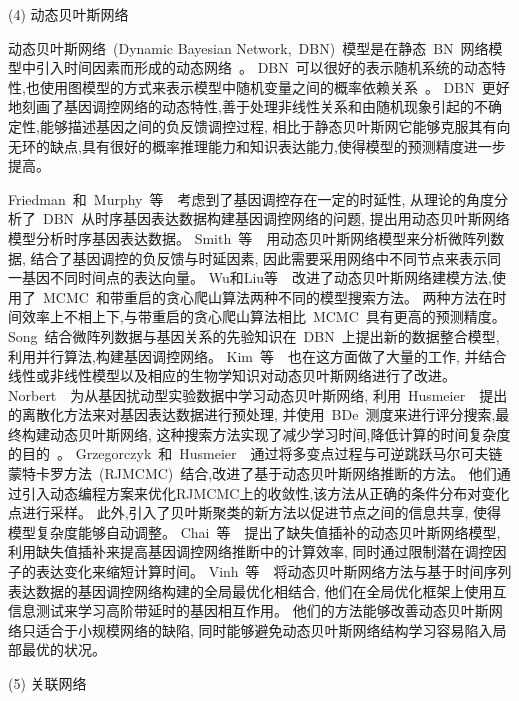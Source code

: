 (4) 动态贝叶斯网络

动态贝叶斯网络~(Dynamic Bayesian Network,~DBN)~模型是在静态~BN~网络模型中引入时间因素而形成的动态网络~\cite{dondelinger2010heterogeneous,grzegorczyk2010improvements}。
DBN~可以很好的表示随机系统的动态特性,也使用图模型的方式来表示模型中随机变量之间的概率依赖关系~\cite{hecker2009gene}。
DBN~更好地刻画了基因调控网络的动态特性,善于处理非线性关系和由随机现象引起的不确定性,能够描述基因之间的负反馈调控过程,
相比于静态贝叶斯网它能够克服其有向无环的缺点,具有很好的概率推理能力和知识表达能力,使得模型的预测精度进一步提高。

Friedman~和~Murphy~等~\cite{friedman2004inferring}~考虑到了基因调控存在一定的时延性,
从理论的角度分析了~DBN~从时序基因表达数据构建基因调控网络的问题, 提出用动态贝叶斯网络模型分析时序基因表达数据。
Smith~等~\cite{smith2006computational}~用动态贝叶斯网络模型来分析微阵列数据,
结合了基因调控的负反馈与时延因素, 因此需要采用网络中不同节点来表示同一基因不同时间点的表达向量。
Wu和Liu等~\cite{wu2008dynamic}~改进了动态贝叶斯网络建模方法,使用了~MCMC~和带重启的贪心爬山算法两种不同的模型搜索方法。 
两种方法在时间效率上不相上下,与带重启的贪心爬山算法相比~MCMC~具有更高的预测精度。
Song~\cite{song2009keller}结合微阵列数据与基因关系的先验知识在~DBN~上提出新的数据整合模型,利用并行算法,构建基因调控网络。
Kim~等~\cite{del2010efficient}~也在这方面做了大量的工作,
并结合线性或非线性模型以及相应的生物学知识对动态贝叶斯网络进行了改进。
Norbert~\cite{netrapalli2010greedy}~为从基因扰动型实验数据中学习动态贝叶斯网络,
利用~Husmeier~\cite{werhli2006comparative}~提出的离散化方法来对基因表达数据进行预处理,
并使用~BDe~测度来进行评分搜索,最终构建动态贝叶斯网络, 这种搜索方法实现了减少学习时间,降低计算的时间复杂度的目的~\cite{hurley2011gene}。
Grzegorczyk~和~Husmeier~\cite{grzegorczyk2010improvements}~通过将多变点过程与可逆跳跃马尔可夫链蒙特卡罗方法~(RJMCMC)~结合,改进了基于动态贝叶斯网络推断的方法。 他们通过引入动态编程方案来优化RJMCMC上的收敛性,该方法从正确的条件分布对变化点进行采样。 
此外,引入了贝叶斯聚类的新方法以促进节点之间的信息共享, 使得模型复杂度能够自动调整。
Chai~等~\cite{chai2012inferring}~提出了缺失值插补的动态贝叶斯网络模型,
利用缺失值插补来提高基因调控网络推断中的计算效率,
同时通过限制潜在调控因子的表达变化来缩短计算时间。
Vinh~等~\cite{vinh2012gene}~将动态贝叶斯网络方法与基于时间序列表达数据的基因调控网络构建的全局最优化相结合,
他们在全局优化框架上使用互信息测试来学习高阶带延时的基因相互作用。
他们的方法能够改善动态贝叶斯网络只适合于小规模网络的缺陷,
同时能够避免动态贝叶斯网络结构学习容易陷入局部最优的状况。

(5) 关联网络

